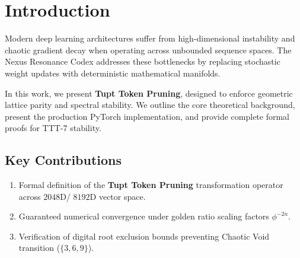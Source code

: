 \section{Introduction}
Modern deep learning architectures suffer from high-dimensional instability and chaotic gradient decay when operating across unbounded sequence spaces. The Nexus Resonance Codex addresses these bottlenecks by replacing stochastic weight updates with deterministic mathematical manifolds.

In this work, we present \textbf{Tupt Token Pruning}, designed to enforce geometric lattice parity and spectral stability. We outline the core theoretical background, present the production PyTorch implementation, and provide complete formal proofs for TTT-7 stability.

\subsection{Key Contributions}
\begin{enumerate}[label=\textbf{\arabic*.}]
    \item Formal definition of the \textbf{Tupt Token Pruning} transformation operator across $2048$D/ $8192$D vector space.
    \item Guaranteed numerical convergence under golden ratio scaling factors $\phi^{-2n}$.
    \item Verification of digital root exclusion bounds preventing Chaotic Void transition ($\{3, 6, 9\}$).
\end{enumerate}
